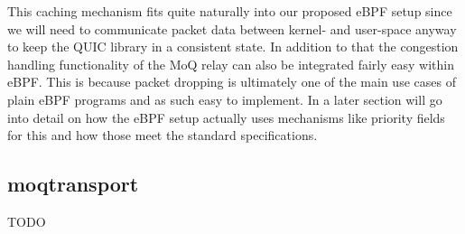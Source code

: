 This caching mechanism fits quite naturally into our proposed eBPF setup since we will need to 
communicate packet data between kernel- and user-space anyway to keep the QUIC library in a 
consistent state.
In addition to that the congestion handling functionality of the MoQ relay can also
be integrated fairly easy within eBPF\@.
This is because packet dropping is ultimately one of the main use cases of plain eBPF 
programs and as such easy to implement.
In a later section will go into detail on how the eBPF setup actually uses mechanisms like 
priority fields for this and how those meet the standard specifications.

\subsection{moqtransport}
TODO

